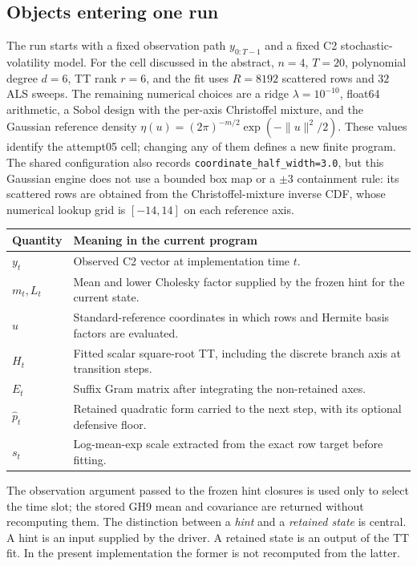 \documentclass[11pt]{article}
\begin{document}
\subsection{Objects entering one run}

The run starts with a fixed observation path $y_{0:T-1}$ and a fixed C2
stochastic-volatility model.  For the cell discussed in the abstract,
$n=4$, $T=20$, polynomial degree $d=6$, TT rank $r=6$, and the fit uses
$R=8192$ scattered rows and $32$ ALS sweeps.  The remaining numerical choices
are a ridge $\lambda=10^{-10}$, float64 arithmetic, a Sobol design with the
per-axis Christoffel mixture, and the Gaussian reference density
$\eta(u)=(2\pi)^{-m/2}\exp(-\lVert u\rVert^2/2)$.  These values identify the
attempt05 cell; changing any of them defines a new finite program.
The shared configuration also records
\texttt{coordinate\_half\_width=3.0}, but this Gaussian engine does not use a
bounded box map or a $\pm3$ containment rule: its scattered rows are obtained
from the Christoffel-mixture inverse CDF, whose numerical lookup grid is
$[-14,14]$ on each reference axis.

\begin{center}
\begin{tabular}{p{}p{}}
\toprule
Quantity & Meaning in the current program\\
\midrule
$y_t$ & Observed C2 vector at implementation time $t$.\\
$m_t,L_t$ & Mean and lower Cholesky factor supplied by the frozen hint for the current state.\\
$u$ & Standard-reference coordinates in which rows and Hermite basis factors are evaluated.\\
$H_t$ & Fitted scalar square-root TT, including the discrete branch axis at transition steps.\\
$E_t$ & Suffix Gram matrix after integrating the non-retained axes.\\
$\widehat p_t$ & Retained quadratic form carried to the next step, with its optional defensive floor.\\
$s_t$ & Log-mean-exp scale extracted from the exact row target before fitting.\\
\bottomrule
\end{tabular}
\end{center}

The observation argument passed to the frozen hint closures is used only to
select the time slot; the stored GH9 mean and covariance are returned without
recomputing them.  The distinction between a \emph{hint} and a \emph{retained state} is central.
A hint is an input supplied by the driver.  A retained state is an output of
the TT fit.  In the present implementation the former is not recomputed from
the latter.
\end{document}
